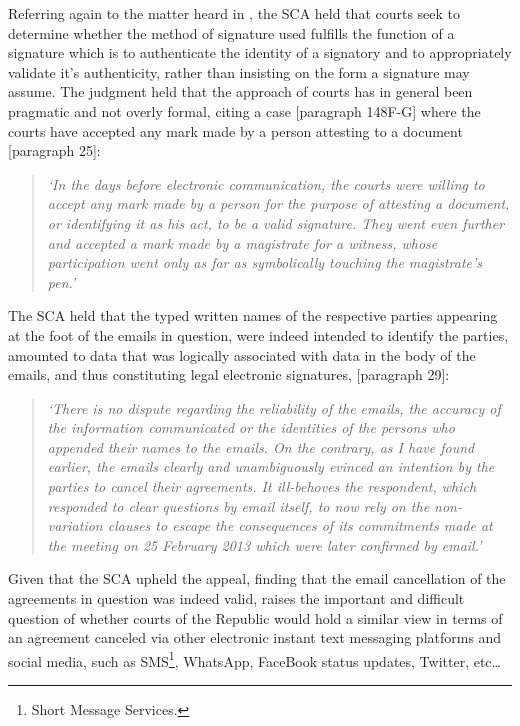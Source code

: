 \documentclass[11pt]{article}
\begin{document}
Referring again to the matter heard in \cite{Cachalia15_spring_forest_v_wilberry},
the SCA held that courts seek to determine whether the method of signature used
fulfills the function of a signature which is to authenticate the identity of a
signatory and to appropriately validate it's authenticity, rather than insisting
on the form a signature may assume. The judgment held that the approach of
courts has in general been pragmatic and not overly formal, citing a case
[paragraph 148F-G]\cite{elec_signa63_putter_v_provincial_insurance} where the
courts have accepted any mark made by a person attesting to a document
[paragraph 25]\cite{Cachalia15_spring_forest_v_wilberry}:
\begin{quote}
\textit{`In the days before electronic communication, the courts were willing to accept any mark made by a person for the purpose of attesting a document, or identifying it as his act, to be a valid signature. They went even further and accepted a mark made by a magistrate for a witness, whose participation went only as far as symbolically touching the magistrate’s pen.'}
\end{quote}
The SCA held that the typed written names of the respective parties appearing at
the foot of the emails in question, were indeed intended to identify the
parties, amounted to data that was logically associated with data in the body of
the emails, and thus constituting legal electronic signatures, [paragraph 29]\cite{Cachalia15_spring_forest_v_wilberry}:
\begin{quote}
\textit{`There is no dispute regarding the reliability of the emails, the accuracy of the information communicated or the identities of the persons who appended their names to the emails. On the contrary, as I have found earlier, the emails clearly and unambiguously evinced an intention by the parties to cancel their agreements. It ill-behoves the respondent, which responded to clear questions by email itself, to now rely on the non-variation clauses to escape the consequences of its commitments made at the meeting on 25 February 2013 which were later confirmed by email.'}
\end{quote}
Given that the SCA upheld the appeal, finding that the email cancellation of the
agreements in question was indeed valid, raises the important and difficult
question of whether courts of the Republic would hold a similar view in terms of
an agreement canceled via other electronic instant text messaging platforms and
social media, such as SMS\footnote{Short Message Services.}, WhatsApp, FaceBook
status updates, Twitter, etc\ldots{}
\end{document}
